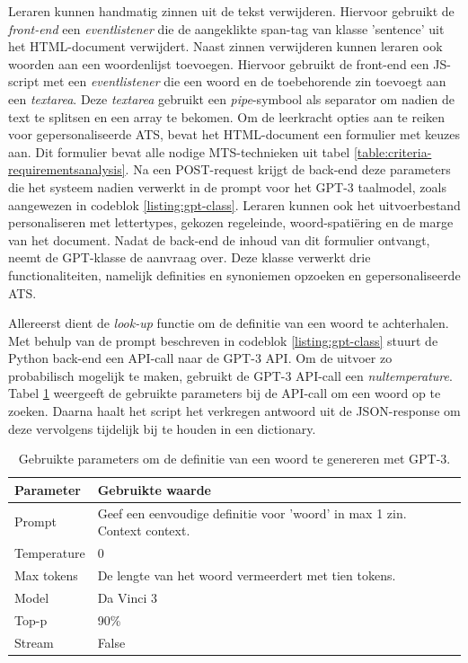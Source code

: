 Leraren kunnen handmatig zinnen uit de tekst verwijderen. Hiervoor gebruikt de \textit{front-end} een \textit{eventlistener} die de aangeklikte span-tag van klasse 'sentence' uit het HTML-document verwijdert. Naast zinnen verwijderen kunnen leraren ook woorden aan een woordenlijst toevoegen. Hiervoor gebruikt de front-end een JS-script met een \textit{eventlistener} die een woord en de toebehorende zin toevoegt aan een \textit{textarea}. Deze \textit{textarea} gebruikt een \textit{pipe}-symbool als separator om nadien de text te splitsen en een array te bekomen. Om de leerkracht opties aan te reiken voor gepersonaliseerde ATS, bevat het HTML-document een formulier met keuzes aan. Dit formulier bevat alle nodige MTS-technieken uit tabel \ref{table:criteria-requirementsanalysis}. Na een POST-request krijgt de back-end deze parameters die het systeem nadien verwerkt in de prompt voor het GPT-3 taalmodel, zoals aangewezen in codeblok \ref{listing:gpt-class}. Leraren kunnen ook het uitvoerbestand personaliseren met lettertypes, gekozen regeleinde, woord-spatiëring en de marge van het document. Nadat de back-end de inhoud van dit formulier ontvangt, neemt de GPT-klasse de aanvraag over. Deze klasse verwerkt drie functionaliteiten, namelijk definities en synoniemen opzoeken en gepersonaliseerde ATS.

\medspace

Allereerst dient de \textit{look-up} functie om de definitie van een woord te achterhalen. Met behulp van de prompt beschreven in codeblok \ref{listing:gpt-class} stuurt de Python back-end een API-call naar de GPT-3 API. Om de uitvoer zo probabilisch mogelijk te maken, gebruikt de GPT-3 API-call een \textit{nultemperature}. Tabel \ref{table:gpt-3-look-up} weergeeft de gebruikte parameters bij de API-call om een woord op te zoeken. Daarna haalt het script het verkregen antwoord uit de JSON-response om deze vervolgens tijdelijk bij te houden in een dictionary.

\begin{center}
	\begin{table}[H]
		\begin{tabular}{| m{5cm}| m{8cm} |}
			\hline
			Parameter & Gebruikte waarde \\ \hline
			Prompt & Geef een eenvoudige definitie voor '{woord}' in max 1 zin. Context {context}. \\ \hline
			Temperature & 0 \\ \hline
			Max tokens & De lengte van het woord vermeerdert met tien tokens. \\ \hline
			Model & Da Vinci 3 \\ \hline
			Top-p & 90\% \\ \hline
			Stream & False \\ \hline
		\end{tabular}
	\caption{Gebruikte parameters om de definitie van een woord te genereren met GPT-3.}
	\label{table:gpt-3-look-up}
	\end{table}
\end{center}

